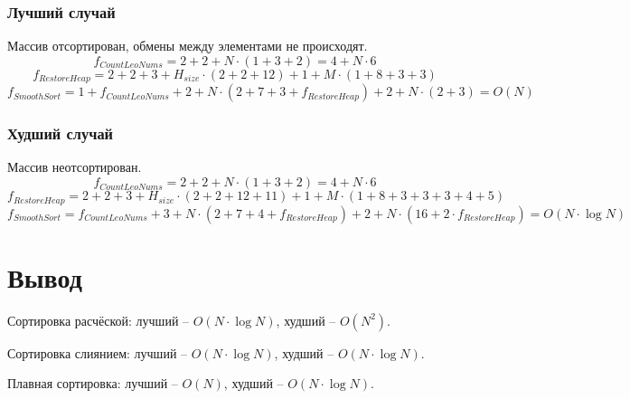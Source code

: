     \subsubsection*{Лучший случай}
    \par Массив отсортирован, обмены между элементами не происходят.
    \begin{equation}
    f_{CountLeoNums} = 2 + 2 + N \cdot (1 + 3 + 2) = 4 + N \cdot 6
    \end{equation}
    \begin{equation}
    f_{RestoreHeap} = 2 + 2 + 3 + H_{size} \cdot (2 + 2 + 12) + 1 + M \cdot (1 + 8 + 3 + 3)
    \end{equation}
    \begin{equation}
    f_{SmoothSort} = 1 + f_{CountLeoNums} + 2 + N \cdot (2 + 7 + 3 + f_{RestoreHeap}) + 2 + N \cdot (2 + 3) = O(N)
    \end{equation}

    \subsubsection*{Худший случай}
    \par Массив неотсортирован.
    \begin{equation}
    f_{CountLeoNums} = 2 + 2 + N \cdot (1 + 3 + 2) = 4 + N \cdot 6
    \end{equation}
    \begin{equation}
    f_{RestoreHeap} = 2 + 2 + 3 + H_{size} \cdot (2 + 2 + 12 + 11) + 1 + M \cdot (1 + 8 + 3 + 3 + 3 + 4 + 5)
    \end{equation}
    \begin{equation}
    f_{SmoothSort} = f_{CountLeoNums} + 3 + N \cdot (2 + 7 + 4 + f_{RestoreHeap}) + 2 + N \cdot (16 + 2 \cdot f_{RestoreHeap}) = O(N \cdot \log N)
    \end{equation}

	\section*{Вывод}
    \par Сортировка расчёской: лучший -- \begin{math}O(N\cdot \log N)\end{math}, худший -- \begin{math}O(N^2)\end{math}.
    \par Сортировка слиянием: лучший -- \begin{math}O(N\cdot \log N)\end{math}, худший -- \begin{math}O(N\cdot \log N)\end{math}.
    \par Плавная сортировка: лучший -- \begin{math}O(N)\end{math}, худший -- \begin{math}O(N\cdot \log N)\end{math}.
\newpage